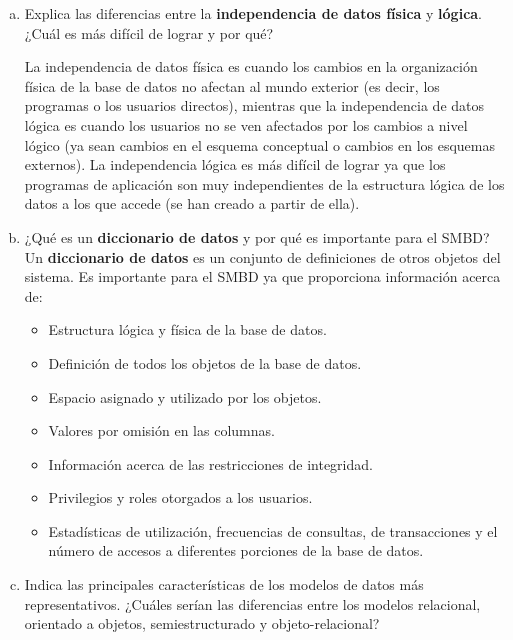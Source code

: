 \documentclass[letterpaper,12pt]{article}
\begin{document}
\begin{enumerate}[a. ]
            \item Explica las diferencias entre la \textbf{independencia de datos física} y \textbf{lógica}. ¿Cuál es más difícil de lograr y por qué?

             La independencia de datos física es cuando los cambios en la organización física de la base de datos no afectan al mundo exterior (es decir, los programas o los usuarios directos), mientras que la independencia de datos lógica es cuando los usuarios no se ven afectados por los cambios a nivel lógico (ya sean cambios en el esquema conceptual o cambios en los esquemas externos). La independencia lógica es más difícil de lograr ya que los programas de aplicación son muy independientes de la estructura lógica de los datos a los que accede (se han creado a partir de ella).

            \item ¿Qué es un \textbf{diccionario de datos} y por qué es importante para el SMBD? \\
            
            Un \textbf{diccionario de datos} es un conjunto de definiciones de otros objetos del sistema. Es importante para el SMBD ya que proporciona información acerca de:
            \begin{itemize}
              \item Estructura lógica y física de la base de datos.
              \item Definición de todos los objetos de la base de datos. 
              \item Espacio asignado y utilizado por los objetos.
              \item Valores por omisión en las columnas.
              \item Información acerca de las restricciones de integridad.
              \item Privilegios y roles otorgados a los usuarios.
              \item Estadísticas de utilización, frecuencias de consultas, de transacciones y el número de accesos a diferentes porciones de la base de datos.
            \end{itemize}

            \item Indica las principales características de los modelos de datos más representativos. ¿Cuáles serían las
            diferencias entre los modelos relacional, orientado a objetos, semiestructurado y objeto-relacional? \\
          \begin{itemize}


\end{itemize}
\end{enumerate}
\end{document}
